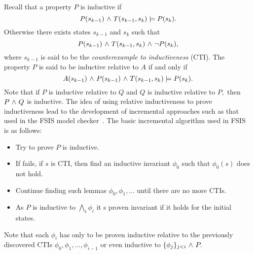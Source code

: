 Recall that a property $P$ is inductive if 
$$ P(s_{k-1}) {\ \wedge \ } T(s_{k-1},s_k) \models P(s_k). $$
 Otherwise there
exists states $s_{k-1}$ and $s_k$ such that  
$$P(s_{k-1}) {\ \wedge \ } T(s_{k-1},s_k) {\ \wedge \ } {\neg} P(s_k),$$
where $s_{k-1}$ is said to be the {\em counterexample to
  inductiveness} (CTI). The property $P$ is said to be inductive
relative to $A$ if and only if
$$A(s_{k-1}) {\ \wedge \ }  P(s_{k-1}) {\ \wedge \ } T(s_{k-1},s_k) \models P(s_k). $$
Note that if $P$ is inductive relative to $Q$ and $Q$ is inductive
relative to $P,$ then $P {\ \wedge \ } Q$ is inductive.  The idea of using
relative inductiveness to prove inductiveness lead to the development
of incremental approaches such as that used in the FSIS model
checker~\cite{Bradley06, Bradley2011}.  The basic incremental
algorithm used in FSIS is as follows:
\begin{itemize}
\item Try to prove $P$ is inductive.
\item If fails,  if $s$ is CTI, then find an inductive invariant
  $\phi_0$ such that $\phi_0(s)$ does not hold. 
\item Continue finding such lemmas $\phi_0, \phi_1, \ldots$ until
  there are no more CTIs. 
\item As $P$ is inductive to $\bigwedge_{i} \phi_i$ it s proven
  invariant if it holds for the initial states.
\end{itemize}  
Note that each $\phi_i$ has only to be proven inductive relative to
the previously discovered CTIs $\phi_0, \phi_1, \ldots, \phi_{i-1}$
or even inductive to $\{ \phi_j \}_{j<i} {\ \wedge \ } P.$ 


